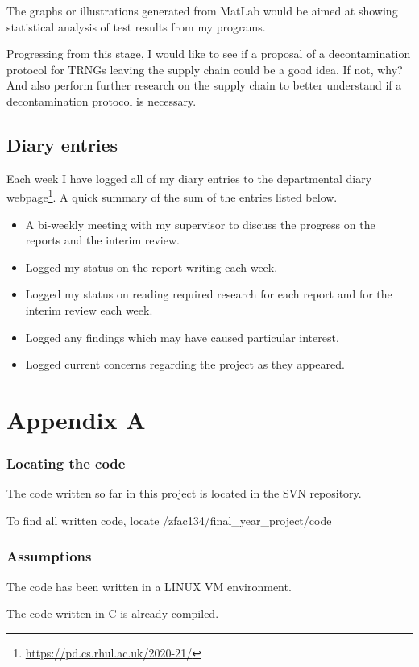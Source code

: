 \documentclass[]{final_report}
\begin{document}
\par{The graphs or illustrations generated from MatLab would be aimed at showing statistical analysis of test results from my programs.}

\par{Progressing from this stage, I would like to see if a proposal of a decontamination protocol for TRNGs leaving the supply chain could be a good idea. If not, why? And also perform further research on the supply chain to better understand if a decontamination protocol is necessary.}

\section*{Diary entries}

\par{Each week I have logged all of my diary entries to the departmental diary webpage\footnote{\url{https://pd.cs.rhul.ac.uk/2020-21/}}. A quick summary of the sum of the entries listed below.}

\begin{itemize}
\item{A bi-weekly meeting with my supervisor to discuss the progress on the reports and the interim review.}
\item{Logged my status on the report writing each week.}
\item{Logged my status on reading required research for each report and for the interim review each week.}
\item{Logged any findings which may have caused particular interest.}
\item{Logged current concerns regarding the project as they appeared.}
\end{itemize}


\newpage
{}




\label{endpage}

\chapter*{Appendix A}
\label{appendixa}

\subsection*{Locating the code}
\par{The code written so far in this project is located in the SVN repository.}
\par{To find all written code, locate /zfac134/final\_year\_project/code}

\subsection*{Assumptions}
\par{The code has been written in a LINUX VM environment.}
\par{The code written in C is already compiled.}
\end{document}
